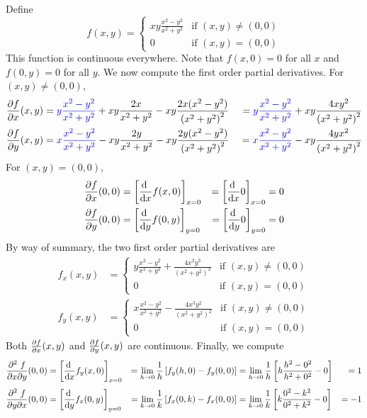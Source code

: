 Define
$$
f(x,y)=\begin{cases}
        xy\frac{x^2-y^2}{x^2+y^2} & \text{if $(x,y)\ne (0,0)$}\\
              0                   & \text{if $(x,y)=(0,0)$}
       \end{cases}
$$
This function is continuous everywhere. Note that $f(x,0)=0$ for all $x$ and
$f(0,y)=0$ for all $y$. We now compute the first order
partial derivatives. For $(x,y)\ne (0,0)$,
\begin{alignat*}{3}
\pdiff{f}{x}(x,y)
  &= \textcolor{blue}{y\frac{x^2-y^2}{x^2+y^2}} +xy\frac{2x}{x^2+y^2}
      - xy\frac{2x(x^2-y^2)}{{(x^2+y^2)}^2}
  &\ = \textcolor{blue}{y\frac{x^2-y^2}{x^2+y^2}}  + xy\frac{4xy^2}{{(x^2+y^2)}^2}\cr
\pdiff{f}{y}(x,y)
  &= \textcolor{blue}{x\frac{x^2-y^2}{x^2+y^2}} -xy\frac{2y}{x^2+y^2}
      - xy\frac{2y(x^2-y^2)}{{(x^2+y^2)}^2}
  &\ = \textcolor{blue}{x\frac{x^2-y^2}{x^2+y^2}}  - xy\frac{4yx^2}{{(x^2+y^2)}^2}
\end{alignat*}
For $(x,y)= (0,0)$,
\begin{alignat*}{5}
\pdiff{f}{x}(0,0)
  &= \left[\diff{}{x}f(x,0)\right]_{x=0}
  &= \left[\diff{}{x} 0\right]_{x=0}
  &=0\\
\pdiff{f}{y}(0,0)
  &= \left[\diff{}{y}f(0,y)\right]_{y=0}
  &= \left[\diff{}{y} 0\right]_{y=0}
  &=0
\end{alignat*}
By way of summary, the two first order partial derivatives are
\begin{align*}
f_x(x,y)&=\begin{cases}
         y\frac{x^2-y^2}{x^2+y^2}  + \frac{4x^2y^3}{{(x^2+y^2)}^2} 
                                         & \text{if $(x,y)\ne (0,0)$}\\
              0                          & \text{if $(x,y)=(0,0)$}
          \end{cases} \\[0.05in]
f_y(x,y)&=\begin{cases}
          x\frac{x^2-y^2}{x^2+y^2}  - \frac{4x^3y^2}{{(x^2+y^2)}^2} 
                                         & \text{if $(x,y)\ne (0,0)$} \\
              0                          & \text{if $(x,y)=(0,0)$}
           \end{cases}
\end{align*}
Both $\pdiff{f}{x}(x,y)$ and  $\pdiff{f}{y}(x,y)$ are continuous.
Finally, we compute 
\begin{alignat*}{5}
\frac{\partial^2\ f}{\partial x\partial y}(0,0)
&=\left[\diff{}{x} f_y(x,0)\right]_{x=0}
&=\lim_{h\rightarrow 0}\frac{1}{h}\left[f_y(h,0)-f_y(0,0)\right]
&=\lim_{h\rightarrow 0}\frac{1}{h}\left[h\frac{h^2-0^2}{h^2+0^2}-0\right]
&=1
\\[0.05in]
\frac{\partial^2\ f}{\partial y\partial x}(0,0)
&=\left[\diff{}{y} f_x(0,y)\right]_{y=0}
&=\lim_{k\rightarrow 0}\frac{1}{k}\left[f_x(0,k)-f_x(0,0)\right]
&=\lim_{k\rightarrow 0}\frac{1}{k}\left[k\frac{0^2-k^2}{0^2+k^2}-0\right]
&=-1
\end{alignat*}




